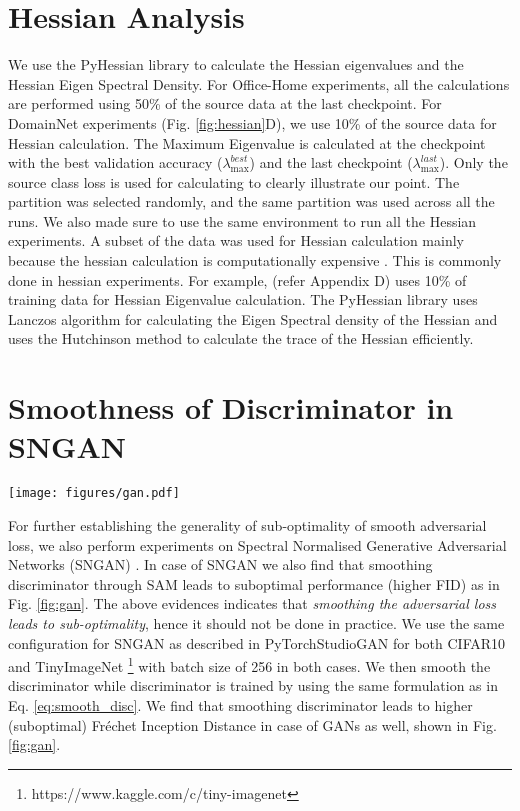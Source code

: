\documentclass[table,dvipsnames]{article}
\theoremstyle{plain}
\theoremstyle{definition}
\theoremstyle{remark}
\begin{document}
\section{Hessian Analysis}\label{app:hess}
We use the PyHessian library \citep{yao2020pyhessian} to calculate the Hessian eigenvalues and the Hessian Eigen Spectral Density. For Office-Home experiments, all the calculations are performed using 50\% of the source data at the last checkpoint. For DomainNet experiments (Fig. \ref{fig:hessian}D), we use 10\% of the source data for Hessian calculation. The Maximum Eigenvalue is calculated at the checkpoint with the best validation accuracy ($\lambda_{\max}^{best}$) and the last checkpoint ($\lambda_{\max}^{last}$). Only the source class loss is used for calculating to clearly illustrate our point. {The partition was selected randomly, and the same partition was used across all the runs. We also made sure to use the same environment to run all the Hessian experiments. A subset of the data was used for Hessian calculation mainly because the hessian calculation is computationally expensive \citep{yao2020pyhessian}. This is commonly done in hessian experiments. For example, \citep{chen2021vision} (refer Appendix D) uses 10\% of training data for Hessian Eigenvalue calculation}. 
The PyHessian library uses Lanczos algorithm \citep{ghorbani2019investigation} for calculating the Eigen Spectral density of the Hessian and uses the Hutchinson method to calculate the trace of the Hessian efficiently. 

\section{Smoothness of Discriminator in SNGAN}
\label{app:gan_exp}
\begin{figure*}[!t]
  \centering
  \texttt{[image: figures/gan.pdf]}
  \caption{SNGAN performance on different datasets, smoothing discriminator in GAN also leads to inferior GAN performance (higher FID) across both datasets.}
  \label{fig:gan}
\end{figure*}
For further establishing the generality of sub-optimality of smooth adversarial loss, we also perform experiments on Spectral Normalised Generative Adversarial Networks (SNGAN) \citep{miyato2018spectral}. In case of SNGAN we also find that smoothing discriminator through SAM leads to suboptimal performance (higher FID) as in Fig. \ref{fig:gan}. The above evidences indicates that \textit{smoothing the adversarial loss leads to sub-optimality}, hence it should not be done in practice. 
We use the same configuration for SNGAN as described in PyTorch\-StudioGAN \citep{kang2020ContraGAN}  for both CIFAR10 \citep{krizhevsky2009learning} and TinyImageNet \footnote{https://www.kaggle.com/c/tiny-imagenet} with batch size of 256 in both cases. We then smooth the discriminator while discriminator is trained by using the same formulation as in Eq. \ref{eq:smooth_disc}. We find that smoothing discriminator leads to higher (suboptimal) Fr\'{e}chet Inception Distance in case of GANs as well, shown in Fig. \ref{fig:gan}.
\end{document}
